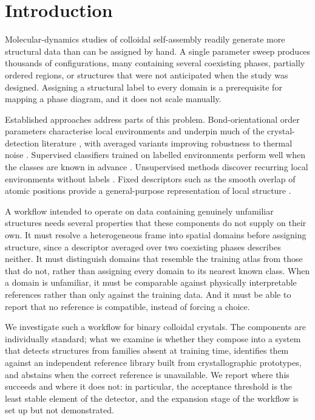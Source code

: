 \section{Introduction}
\label{sec:intro}

Molecular-dynamics studies of colloidal self-assembly readily generate more structural data
than can be assigned by hand. A single parameter sweep produces thousands of configurations,
many containing several coexisting phases, partially ordered regions, or structures that
were not anticipated when the study was designed. Assigning a structural label to every
domain is a prerequisite for mapping a phase diagram, and it does not scale manually.

Established approaches address parts of this problem. Bond-orientational order parameters
characterise local environments and underpin much of the crystal-detection literature
, with averaged variants improving robustness to
thermal noise . Supervised classifiers trained on
labelled environments perform well when the classes are known in advance
. Unsupervised methods discover recurring local environments without
labels . Fixed descriptors such as
the smooth overlap of atomic positions provide a general-purpose representation of local
structure .

A workflow intended to operate on data containing genuinely unfamiliar structures needs
several properties that these components do not supply on their own. It must resolve a
heterogeneous frame into spatial domains before assigning structure, since a descriptor
averaged over two coexisting phases describes neither. It must distinguish domains that
resemble the training atlas from those that do not, rather than assigning every domain to
its nearest known class. When a domain is unfamiliar, it must be comparable against
physically interpretable references rather than only against the training data. And it must
be able to report that no reference is compatible, instead of forcing a choice.

We investigate such a workflow for binary colloidal crystals. The components are individually
standard; what we examine is whether they compose into a system that detects structures from
families absent at training time, identifies them against an independent reference library
built from crystallographic prototypes, and abstains when the correct reference is
unavailable. We report where this succeeds and where it does not: in particular, the
acceptance threshold is the least stable element of the detector, and the expansion stage of
the workflow is set up but not demonstrated.

